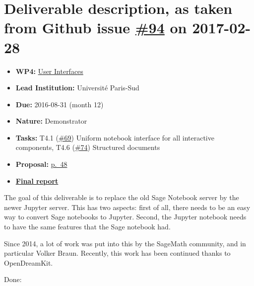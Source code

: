 \section*{\texorpdfstring{Deliverable description, as taken from Github
issue
\href{https://github.com/OpenDreamKit/OpenDreamKit/issues/94}{\#94} on
2017-02-28}{Deliverable description, as taken from Github issue \#94 on 2017-02-28}}\label{deliverable-description-as-taken-from-github-issue-94-on-2017-02-28}

\begin{itemize}
\tightlist
\item
  \textbf{WP4:}
  \href{https://github.com/OpenDreamKit/OpenDreamKit/tree/master/WP4}{User
  Interfaces}
\item
  \textbf{Lead Institution:} Université Paris-Sud
\item
  \textbf{Due:} 2016-08-31 (month 12)
\item
  \textbf{Nature:} Demonstrator
\item
  \textbf{Tasks:} T4.1
  (\href{https://github.com/OpenDreamKit/OpenDreamKit/issues/69}{\#69})
  Uniform notebook interface for all interactive components, T4.6
  (\href{https://github.com/OpenDreamKit/OpenDreamKit/issues/74}{\#74})
  Structured documents
\item
  \textbf{Proposal:}
  \href{https://github.com/OpenDreamKit/OpenDreamKit/raw/master/Proposal/proposal-www.pdf}{p.~48}
\item
  \textbf{\href{https://github.com/OpenDreamKit/OpenDreamKit/raw/master/WP4/D4.5/report-final.pdf}{Final
  report}}
\end{itemize}

The goal of this deliverable is to replace the old Sage Notebook server
by the newer Jupyter server. This has two aspects: first of all, there
needs to be an easy way to convert Sage notebooks to Jupyter. Second,
the Jupyter notebook needs to have the same features that the Sage
notebook had.

Since 2014, a lot of work was put into this by the SageMath community,
and in particular Volker Braun. Recently, this work has been continued
thanks to OpenDreamKit.

Done:


